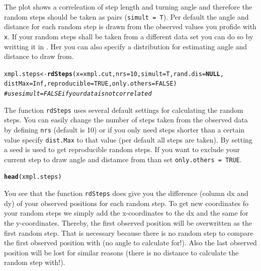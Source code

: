 \documentclass[11pt, a4paper]{article}\usepackage[]{graphicx}\usepackage[]{color}
\makeatletter
\newcommand{\hlnum}[1]{\textcolor[rgb]{0.686,0.059,0.569}{#1}}%
\newcommand{\hlcom}[1]{\textcolor[rgb]{0.678,0.584,0.686}{\textit{#1}}}%
\newcommand{\hlstd}[1]{\textcolor[rgb]{0.345,0.345,0.345}{#1}}%
\newcommand{\hlkwa}[1]{\textcolor[rgb]{0.161,0.373,0.58}{\textbf{#1}}}%
\newcommand{\hlkwb}[1]{\textcolor[rgb]{0.69,0.353,0.396}{#1}}%
\newcommand{\hlkwc}[1]{\textcolor[rgb]{0.333,0.667,0.333}{#1}}%
\newcommand{\hlkwd}[1]{\textcolor[rgb]{0.737,0.353,0.396}{\textbf{#1}}}%
\newenvironment{kframe}{%
 \def\at@end@of@kframe{}%
 \ifinner\ifhmode%
  \def\at@end@of@kframe{\end{minipage}}%
  \begin{minipage}{\columnwidth}%
 \fi\fi%
 \def\FrameCommand##1{\hskip\@totalleftmargin \hskip-\fboxsep
 \colorbox{shadecolor}{##1}\hskip-\fboxsep
     \hskip-\linewidth \hskip-\@totalleftmargin \hskip\columnwidth}%
 \MakeFramed {\advance\hsize-\width
   \@totalleftmargin\z@ \linewidth\hsize
   \@setminipage}}%
 {\par\unskip\endMakeFramed%
 \at@end@of@kframe}
\newenvironment{knitrout}{}{} %
\makeatother
\begin{document}
The plot shows a correleation of step length and turning angle and therefore the random steps should be taken as pairs (\texttt{simult = T}). Per default the angle and distance for each random step is drawn from the observed values you profide with \texttt{x}. If your random steps shall be taken from a different data set you can do so by writting it in . Her you can also specify a distribution for estimating angle and distance to draw from. 

\begin{knitrout}
\color{fgcolor}\begin{kframe}
\begin{alltt}
\hlstd{xmpl.steps} \hlkwb{<-} \hlkwd{rdSteps}\hlstd{(}\hlkwc{x} \hlstd{= xmpl.cut,} \hlkwc{nrs} \hlstd{=} \hlnum{10}\hlstd{,} \hlkwc{simult} \hlstd{= T,} \hlkwc{rand.dis} \hlstd{=} \hlkwa{NULL}\hlstd{,}
                      \hlkwc{distMax} \hlstd{=} \hlnum{Inf}\hlstd{,} \hlkwc{reproducible} \hlstd{=} \hlnum{TRUE}\hlstd{,} \hlkwc{only.others} \hlstd{=} \hlnum{FALSE}\hlstd{)}
          \hlcom{# use simult = FALSE if your data is not correlated}
\end{alltt}
\end{kframe}
\end{knitrout}

The function \texttt{rdSteps} uses several default settings for calculating the random steps. You can easily change the number of steps taken from the observed data by defining \texttt{nrs} (default is 10) or if you only need steps shorter than a certain value specify \texttt{dist.Max} to that value (per default all steps are taken). By setting  a seed is used to get reproducible random steps. If you want to exclude your current step to draw angle and distamce from than set \texttt{only.others = TRUE}. 


\begin{knitrout}
\color{fgcolor}\begin{kframe}
\begin{alltt}
\hlkwd{head}\hlstd{(xmpl.steps)}
\end{alltt}


{\ttfamily\noindent\bfseries\color{errorcolor}{\#\# Error in head(xmpl.steps): Objekt 'xmpl.steps' nicht gefunden}}\end{kframe}
\end{knitrout}

You see that the function \texttt{rdSteps} does give you the difference (column dx and dy) of your observed positions for each random step. To get new coordinates fo your random steps we simply add the x-coordinates to the dx and the same for the y-coordinates. Thereby, the first observed position will be overwritten as the first random step. That is necessary because there is no random step to compare the first observed position with (no angle to calculate for!). Also the last observed position will be lost for similar reasons (there is no distance to calculate the random step with!).
\end{document}
